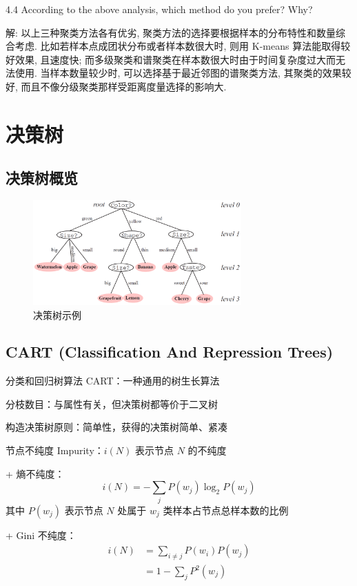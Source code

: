 \documentclass[openany]{ctexbook}
\theoremstyle{kaiti}
\theoremstyle{normal}
\begin{document}
4.4 According to the above analysis, which method do you prefer? Why?

解: 以上三种聚类方法各有优劣, 聚类方法的选择要根据样本的分布特性和数量综合考虑. 比如若样本点成团状分布或者样本数很大时, 则用 K-means 算法能取得较好效果, 且速度快; 而多级聚类和谱聚类在样本数很大时由于时间复杂度过大而无法使用. 当样本数量较少时, 可以选择基于最近邻图的谱聚类方法, 其聚类的效果较好, 而且不像分级聚类那样受距离度量选择的影响大.

\chapter{决策树}

\section{决策树概览}

\begin{figure}
  \centering
  \includegraphics[width=8cm]{1627808711971-11.1.png}
  \caption{决策树示例}
\end{figure}

\section{CART (Classification And Repression Trees)}

分类和回归树算法 CART：一种通用的树生长算法

分枝数目：与属性有关，但决策树都等价于二叉树

构造决策树原则：简单性，获得的决策树简单、紧凑

节点不纯度 Impurity：$i\left(N \right)$ 表示节点 $N$ 的不纯度

+ 熵不纯度：
  \begin{equation}
  i\left(N \right)=-\sum_jP\left(w_j \right)\log_2P\left(w_j \right)
  \end{equation}
  其中 $P\left(w_j \right)$ 表示节点 $N$ 处属于 $w_j$ 类样本占节点总样本数的比例

+ Gini 不纯度：
  \begin{equation}
  \begin{aligned}
    i\left(N \right)
    &=\sum_{i\ne j}P\left(w_i \right)P\left(w_j \right)\\
    &=1-\sum_jP^2\left(w_j \right)
  \end{aligned}
  \end{equation}
\end{document}
